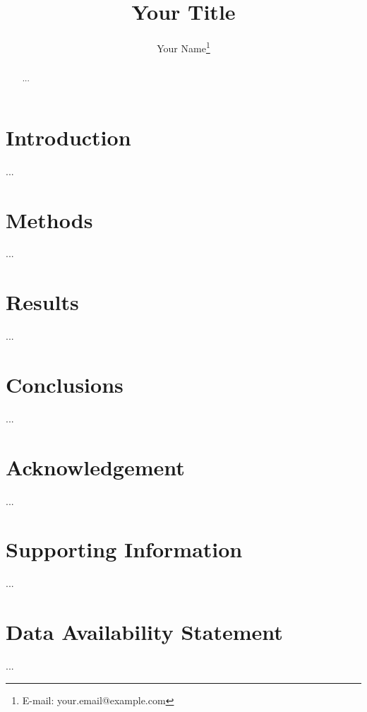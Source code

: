 \documentclass[11pt]{article}
\author[1]{Your Name\thanks{E-mail: your.email@example.com}}
\affil[1]{Your Institution, Department, Address}
\title{Your Title}
\begin{document}
\maketitle

\begin{abstract}
    ...
\end{abstract}

\section{Introduction}

...\autocite{Dummy2024}

\section{Methods}

...

\section{Results}

...

\section{Conclusions}

...

\section*{Acknowledgement}

...

\section*{Supporting Information}

...

\section*{Data Availability Statement}

...

\printbibliography
\end{document}
